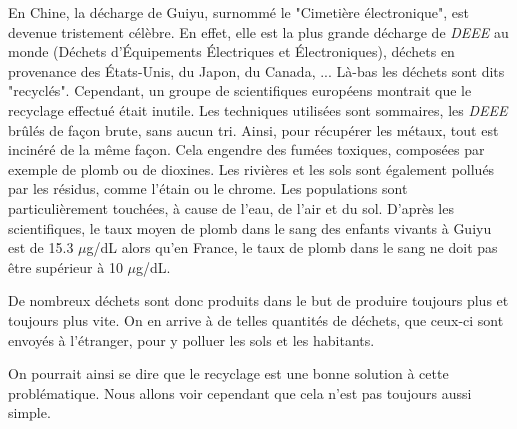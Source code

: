 \bigbreak En Chine, la décharge de Guiyu, surnommé le "Cimetière électronique", est devenue tristement célèbre. En effet, elle est la plus grande décharge de \textit{DEEE} au monde (Déchets d’Équipements Électriques et Électroniques), déchets en provenance des États-Unis, du Japon, du Canada, ... Là-bas les déchets sont dits "recyclés". Cependant, un groupe de scientifiques européens\cite{Deeechine} montrait que	le recyclage effectué était inutile. Les techniques utilisées sont sommaires, les \textit{DEEE} brûlés de façon brute, sans aucun tri. Ainsi, pour récupérer les métaux, tout est incinéré de la même façon. Cela engendre des fumées toxiques, composées par exemple de plomb ou de dioxines. Les rivières et les sols sont également pollués par les résidus, comme l'étain ou le chrome. Les populations sont particulièrement touchées, à cause de l'eau, de l'air et du sol. D'après les scientifiques, le taux moyen de plomb dans le sang des enfants vivants à Guiyu est de 15.3 $\mu$g/dL alors qu'en France, le taux de plomb dans le sang ne doit pas être supérieur à 10 $\mu$g/dL. 

\bigbreak De nombreux déchets sont donc produits dans le but de produire toujours plus et toujours plus vite. On en arrive à de telles quantités de déchets, que ceux-ci sont envoyés à l'étranger, pour y polluer les sols et les habitants. 

On pourrait ainsi se dire que le recyclage est une bonne solution à cette problématique. Nous allons voir cependant que cela n'est pas toujours aussi simple.